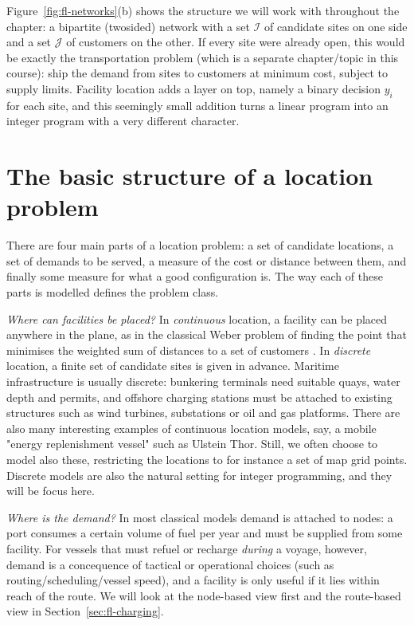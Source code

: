 Figure~\ref{fig:fl-networks}(b) shows the structure we will work with throughout the chapter: a bipartite (twosided) network with a set $\mathcal{I}$ of candidate sites on one side and a set $\mathcal{J}$ of customers on the other. If every site were already open, this would be exactly the transportation problem (which is a separate chapter/topic in this course): ship the demand from sites to customers at minimum cost, subject to supply limits. Facility location adds a layer on top, namely a binary decision $y_i$ for each site, and this seemingly small addition turns a linear program into an integer program with a very different character.


\section{The basic structure of a location problem}
\label{sec:fl-anatomy}

There are four main parts of a location problem: a set of candidate locations, a set of demands to be served, a measure of the cost or distance between them, and finally some measure for what a good configuration is. The way each of these parts is modelled defines the problem class.

\emph{Where can facilities be placed?} In \emph{continuous} location, a facility can be placed anywhere in the plane, as in the classical Weber problem of finding the point that minimises the weighted sum of distances to a set of customers \citep{Weber1909}. In \emph{discrete} location, a finite set of candidate sites is given in advance. Maritime infrastructure is usually discrete: bunkering terminals need suitable quays, water depth and permits, and offshore charging stations must be attached to existing structures such as wind turbines, substations or oil and gas platforms. There are also many interesting examples of continuous location models, say, a mobile "energy replenishment vessel" such as Ulstein Thor. Still, we often choose to model also these, restricting the locations to for instance a set of map grid points. Discrete models are also the natural setting for integer programming, and they will be focus here.

\emph{Where is the demand?} In most classical models demand is attached to nodes: a port consumes a certain volume of fuel per year and must be supplied from some facility. For vessels that must refuel or recharge \emph{during} a voyage, however, demand is a concequence of tactical or operational choices (such as routing/scheduling/vessel speed), and a facility is only useful if it lies within reach of the route. We will look at the node-based view first and the route-based view in Section~\ref{sec:fl-charging}.

